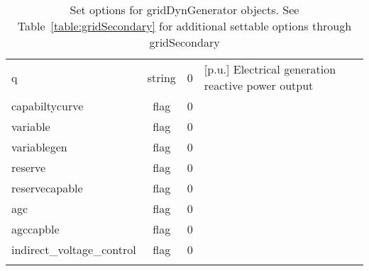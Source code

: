\begin{longtable}{p{5cm} c c p{7cm}}
q & string & 0 & [p.u.] Electrical generation reactive power output\\
capabiltycurve & flag & 0 & \\
variable & flag & 0 & \\
variablegen & flag & 0 & \\
reserve & flag & 0 & \\
reservecapable & flag & 0 & \\
agc & flag & 0 & \\
agccapble & flag & 0 & \\
indirect\_voltage\_control & flag & 0 & \\
\hline
\caption{Set options for gridDynGenerator objects. See Table~\ref{table:gridSecondary} for additional settable options through gridSecondary}
\label{table:gridDynGenerator}
\end{longtable}

